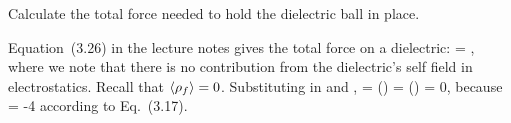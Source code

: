 \newcommand{\vF}{\vb{F}}

\begin{problem}
	Calculate the total force needed to hold the dielectric ball in place.
\end{problem}

\begin{solution}
	Equation~(3.26) in the lecture notes gives the total force on a dielectric:
	\beq
		\vF = \int [\evrhof\! \vEo + (\evP \cdot \grad) \vEo] \dcx,
	\eeq
	where we note that there is no contribution from the dielectric's self field in electrostatics.  Recall that $\evrhof = 0$.  Substituting in  and ,
	\beq
		\vF = \int (\chi\!\evE \cdot \grad) \vEo \dcx
		= \int \frac{\chi}{\eps} (\div{\evD}) \vEo \dcx
		= 0,
	\eeq
	because
	\beq
		\div{\evD} = -4\pi \!\evrhof
	\eeq
	according to Eq.~(3.17).
\end{solution}
